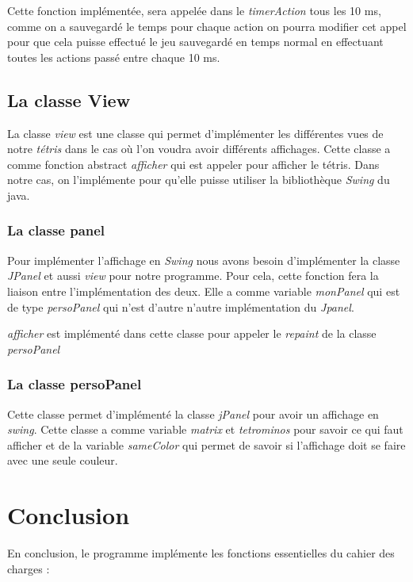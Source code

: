 \documentclass{article}           %
\begin{document}
Cette fonction implémentée, sera appelée dans le \emph{timerAction} tous les 10 ms, comme on a sauvegardé le temps pour chaque action on pourra modifier cet appel pour que cela puisse effectué le jeu sauvegardé en temps normal en effectuant toutes les actions passé entre chaque 10 ms.


\subsection{La classe View}
La classe \emph{view} est une classe qui permet d'implémenter les différentes vues de notre \emph{tétris} dans le cas où l'on voudra avoir différents affichages. Cette classe a comme fonction abstract \emph{afficher} qui est appeler pour afficher le tétris. Dans notre cas, on l'implémente pour qu'elle puisse utiliser la bibliothèque \emph{Swing} du java.

\subsubsection{La classe panel}
Pour implémenter l'affichage en \emph{Swing} nous avons besoin d'implémenter la classe \emph{JPanel} et aussi \emph{view} pour notre programme. Pour cela, cette fonction fera la liaison entre l'implémentation des deux. Elle a comme variable \emph{monPanel} qui est de type \emph{persoPanel} qui n'est d'autre n'autre implémentation du \emph{Jpanel}.

\emph{afficher} est implémenté dans cette classe pour appeler le \emph{repaint} de la classe \emph{persoPanel}

\subsubsection{La classe persoPanel}
Cette classe permet d'implémenté la classe \emph{jPanel} pour avoir un affichage en \emph{swing}. Cette classe a comme variable \emph{matrix} et \emph{tetrominos} pour savoir ce qui faut afficher et de la variable \emph{sameColor} qui permet de savoir si l'affichage doit se faire avec une seule couleur.

\section{Conclusion}               %

En conclusion, le programme implémente les fonctions essentielles du cahier des charges :
\end{document}
